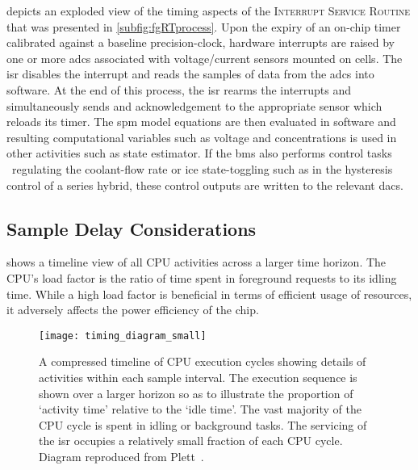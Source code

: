    depicts   an   exploded   view   of   the   timing
aspects  of  the  \textsc{Interrupt  Service  Routine}  that  was  presented  in
\cref{subfig:fgRTprocess}.  Upon  the  expiry  of an  on-chip  timer  calibrated
against a  baseline precision-clock,  hardware interrupts are  raised by  one or
more \glspl{adc} associated  with voltage/current sensors mounted  on cells. The
\gls{isr}  disables  the interrupt  and  reads  the  samples  of data  from  the
\glspl{adc} into software. At the end  of this process, the \gls{isr} rearms the
interrupts  and  simultaneously sends  and  acknowledgement  to the  appropriate
sensor  which  reloads  its  timer.  The  \gls{spm}  model  equations  are  then
evaluated in software and resulting  computational variables such as voltage and
concentrations  is used  in other  activities such  as state  estimator. If  the
\gls{bms} also performs control tasks \eg~regulating the coolant-flow rate or
\gls{ice} state-toggling such  as in the hysteresis control of  a series hybrid,
these control outputs are written to the relevant \glspl{dac}.



\subsection{Sample Delay Considerations}

 shows a timeline view of all CPU activities across
a larger  time horizon.  The CPU's  load factor is  the ratio  of time  spent in
foreground requests to  its idling time. While a high  load factor is beneficial
in  terms of  efficient  usage  of resources,  it  adversely  affects the  power
efficiency of the chip.

\begin{figure}[!htbp]
    \centering
    \texttt{[image: timing\_diagram\_small]}
    \caption[Timeline of  activities over multiple CPU cycles of a real-time
    controller]{A compressed timeline of CPU execution cycles showing details of
        activities within each sample interval. The execution sequence is shown
        over a larger horizon so as to illustrate the proportion of `activity
        time' relative to the `idle time'. The vast majority of the CPU cycle is
        spent in idling or background tasks. The servicing of the \gls{isr}
        occupies a relatively small fraction of each CPU cycle. Diagram
    reproduced from Plett~\cite{PlettECE5540_02}.}
    \label{fig:timingdiagramSmall}
\end{figure}

